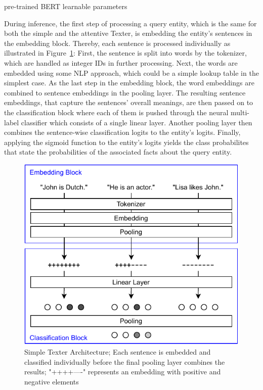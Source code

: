 pre-trained BERT
learnable parameters

During inference, the first step of processing a query entity, which is the same for both the simple and the attentive Texter, is embedding the entity's sentences in the embedding block. Thereby, each sentence is processed individually as illustrated in Figure~\ref{fig:4_approach/1_texter/1_simple_model/simple_architecture}: First, the sentence is split into words by the tokenizer, which are handled as integer IDs in further processing. Next, the words are embedded using some NLP approach, which could be a simple lookup table in the simplest case. As the last step in the embedding block, the word embeddings are combined to sentence embeddings in the pooling layer. The resulting sentence embeddings, that capture the sentences' overall meanings, are then passed on to the classification block where each of them is pushed through the neural multi-label classifier which consists of a single linear layer. Another pooling layer then combines the sentence-wise classification logits to the entity's logits. Finally, applying the sigmoid function to the entity's logits yields the class probabilites that state the probabilities of the associated facts about the query entity.

\begin{figure}[t]
    \centering
    \includegraphics{4_approach/1_texter/1_simple_model/simple_architecture}
    \caption{Simple Texter Architecture; Each sentence is embedded and classified individually before the final pooling layer combines the results; "++++----" represents an embedding with positive and negative elements}
    \label{fig:4_approach/1_texter/1_simple_model/simple_architecture}
\end{figure}

